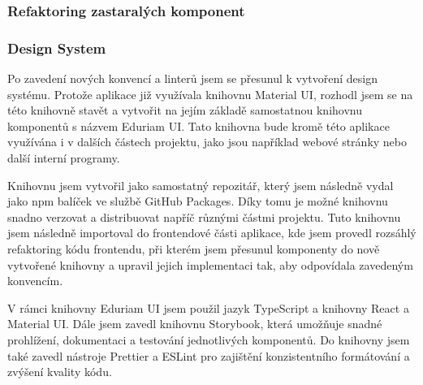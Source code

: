 \subsubsection{Refaktoring zastaralých komponent}


\subsubsection{Design System}

Po zavedení nových konvencí a linterů jsem se přesunul k vytvoření design systému. Protože aplikace již využívala knihovnu Material UI, rozhodl jsem se na této knihovně stavět a vytvořit na jejím základě samostatnou knihovnu komponentů s názvem Eduriam UI. Tato knihovna bude kromě této aplikace využívána i v dalších částech projektu, jako jsou například webové stránky nebo další interní programy.

Knihovnu jsem vytvořil jako samostatný repozitář, který jsem následně vydal jako npm balíček ve službě GitHub Packages. %
Díky tomu je možné knihovnu snadno verzovat a distribuovat napříč různými částmi projektu. Tuto knihovnu jsem následně importoval do frontendové části aplikace, kde jsem provedl rozsáhlý refaktoring kódu frontendu, při kterém jsem přesunul komponenty do nově vytvořené knihovny a upravil jejich implementaci tak, aby odpovídala zavedeným konvencím.

V rámci knihovny Eduriam UI jsem použil jazyk TypeScript a knihovny React a Material UI. Dále jsem zavedl knihovnu Storybook, která umožňuje snadné prohlížení, dokumentaci a testování jednotlivých komponentů. Do knihovny jsem také zavedl nástroje Prettier a ESLint pro zajištění konzistentního formátování a zvýšení kvality kódu.


